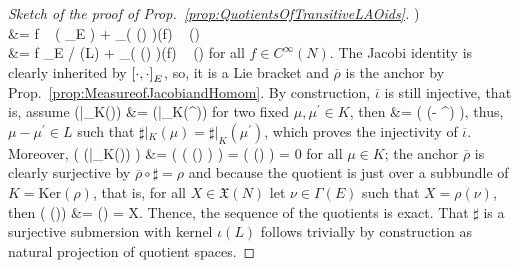 \begin{proof}[Sketch of the proof of Prop.~\ref{prop:QuotientsOfTransitiveLAOids}]
\bigr)
\\
&=
f ~ \sharp\bigl(
	\mleft[ \nu, \eta \mright]_E
\bigr)
	+ _{\overline{\rho}( \sharp(\nu) )}(f) ~ \sharp(\eta)
\\
&=
f \mleft[ \sharp(\nu), \sharp(\eta) \mright]_{E \big/ \iota(L)}
	+ _{\overline{\rho}( \sharp(\nu) )}(f) ~ \sharp(\eta)
\eas
for all $f\in C^\infty(N)$. The Jacobi identity is clearly inherited by $\mleft[ \cdot, \cdot \mright]_E$, so, it is a Lie bracket and $\overline{\rho}$ is the anchor by Prop.~\ref{prop:MeasureofJacobiandHomom}.
By construction, $\overline{\iota}$ is still injective, that is, assume
\bas
\overline{\iota}\bigl(\sharp|_K(\mu)\bigr)
&=
\overline{\iota}\bigl(\sharp|_K(\mu^\prime)\bigr)
\eas
for two fixed $\mu, \mu^\prime \in K$, then
&=
\sharp\bigl(
	\iota(\mu - \mu^\prime)
\bigr),
\eas
thus, $\mu - \mu^\prime \in L$ such that $\sharp|_K(\mu) = \sharp|_K(\mu^\prime)$, which proves the injectivity of $\overline{\iota}$.
Moreover,
\bas
\overline{\rho}\mleft(
	\overline{\iota}\bigl(\sharp|_K(\mu)\bigr)
\mright)
&=
\overline{\rho}\mleft(
	\sharp\bigl( \iota(\mu) \bigr)
\mright)
=
\rho\bigl(
	\iota(\mu)
\bigr)
=
0
\eas
for all $\mu \in K$; the anchor $\overline{\rho}$ is clearly surjective by $\overline{\rho} \circ \sharp= \rho$ and because the quotient is just over a subbundle of $K = \mathrm{Ker}(\rho)$, that is, for all $X \in \mathfrak{X}(N)$ let $\nu \in \Gamma(E)$ such that $X = \rho(\nu)$, then
\bas
\overline{\rho}\bigl( \sharp(\nu)\bigr)
&=
\rho(\nu)
=
X.
\eas
Thence, the sequence of the quotients is exact. That $\sharp$ is a surjective submersion with kernel $\iota(L)$ follows trivially by construction as natural projection of quotient spaces.
\end{proof}

